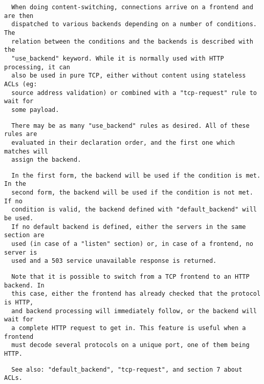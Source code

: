 \begin{verbatim}
  When doing content-switching, connections arrive on a frontend and are then
  dispatched to various backends depending on a number of conditions. The
  relation between the conditions and the backends is described with the
  "use_backend" keyword. While it is normally used with HTTP processing, it can
  also be used in pure TCP, either without content using stateless ACLs (eg:
  source address validation) or combined with a "tcp-request" rule to wait for
  some payload.
\end{verbatim}

\begin{verbatim}
  There may be as many "use_backend" rules as desired. All of these rules are
  evaluated in their declaration order, and the first one which matches will
  assign the backend.
\end{verbatim}

\begin{verbatim}
  In the first form, the backend will be used if the condition is met. In the
  second form, the backend will be used if the condition is not met. If no
  condition is valid, the backend defined with "default_backend" will be used.
  If no default backend is defined, either the servers in the same section are
  used (in case of a "listen" section) or, in case of a frontend, no server is
  used and a 503 service unavailable response is returned.
\end{verbatim}

\begin{verbatim}
  Note that it is possible to switch from a TCP frontend to an HTTP backend. In
  this case, either the frontend has already checked that the protocol is HTTP,
  and backend processing will immediately follow, or the backend will wait for
  a complete HTTP request to get in. This feature is useful when a frontend
  must decode several protocols on a unique port, one of them being HTTP.
\end{verbatim}

\begin{verbatim}
  See also: "default_backend", "tcp-request", and section 7 about ACLs.
\end{verbatim}

